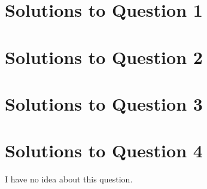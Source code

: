 \documentclass[a4paper,12pt]{article}
\begin{document}
\section{Solutions to Question 1}


\section{Solutions to Question 2}


\section{Solutions to Question 3}


\section{Solutions to Question 4}
I have no idea about this question.
\printbibliography
\end{document}
